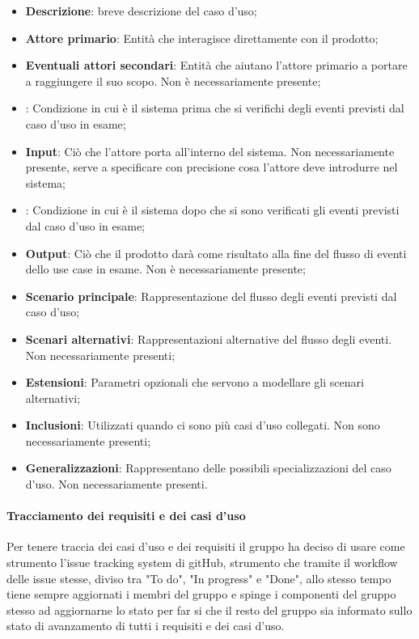 \documentclass[../norme_di_progetto.tex]{subfiles}
\begin{document}
\begin{itemize}
    \item \textbf{Descrizione}: breve descrizione del caso d'uso;
    \item \textbf{Attore primario}: Entità che interagisce direttamente con il prodotto;
    \item \textbf{Eventuali attori secondari}: Entità che aiutano l'attore primario a portare a raggiungere il suo scopo. Non è necessariamente presente;
    \item {}: Condizione in cui è il sistema prima che si verifichi degli eventi previsti dal caso d'uso in esame;
    \item \textbf{Input}: Ciò che l'attore porta all'interno del sistema. Non necessariamente presente, serve a specificare con precisione cosa l'attore deve introdurre nel sistema;
    \item {}: Condizione in cui è il sistema dopo che si sono verificati gli eventi previsti dal caso d'uso in esame;
    \item \textbf{Output}: Ciò che il prodotto darà come risultato alla fine del flusso di eventi dello use case in esame. Non è necessariamente presente;
    \item \textbf{Scenario principale}: Rappresentazione del flusso degli eventi previsti dal caso d'uso;
    \item \textbf{Scenari alternativi}: Rappresentazioni alternative del flusso degli eventi. Non necessariamente presenti;
    \item \textbf{Estensioni}: Parametri opzionali che servono a modellare gli scenari alternativi;
    \item \textbf{Inclusioni}: Utilizzati quando ci sono più casi d'uso collegati. Non sono necessariamente presenti;
    \item \textbf{Generalizzazioni}: Rappresentano delle possibili specializzazioni del caso d'uso. Non necessariamente presenti.
\end{itemize}


\paragraph{Tracciamento dei requisiti e dei casi d'uso}
Per tenere traccia dei casi d'uso e dei requisiti il gruppo ha deciso di usare come strumento l'issue tracking system di gitHub, strumento che tramite il workflow delle issue stesse, diviso tra "To do", "In progress" e "Done", allo stesso tempo tiene sempre aggiornati i membri del gruppo e spinge i componenti del gruppo stesso ad aggiornarne lo stato per far si che il resto del gruppo sia informato sullo stato di avanzamento di tutti i requisiti e dei casi d'uso.
\end{document}
